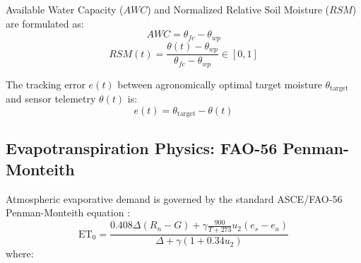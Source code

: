 \documentclass[conference]{IEEEtran}
\begin{document}
Available Water Capacity ($AWC$) and Normalized Relative Soil Moisture ($RSM$) are formulated as:
\begin{equation}
AWC = \theta_{fc} - \theta_{wp}
\label{eq:awc}
\end{equation}
\begin{equation}
RSM(t) = \frac{\theta(t) - \theta_{wp}}{\theta_{fc} - \theta_{wp}} \in [0, 1]
\label{eq:rsm}
\end{equation}

The tracking error $e(t)$ between agronomically optimal target moisture $\theta_{\text{target}}$ and sensor telemetry $\theta(t)$ is:
\begin{equation}
e(t) = \theta_{\text{target}} - \theta(t)
\label{eq:error}
\end{equation}

\subsection{Evapotranspiration Physics: FAO-56 Penman-Monteith}
Atmospheric evaporative demand is governed by the standard ASCE/FAO-56 Penman-Monteith equation \cite{allen1998crop}:
\begin{equation}
\text{ET}_0 = \frac{0.408 \Delta (R_n - G) + \gamma \frac{900}{T + 273} u_2 (e_s - e_a)}{\Delta + \gamma (1 + 0.34 u_2)}
\label{eq:fao56}
\end{equation}
where:
\end{document}
